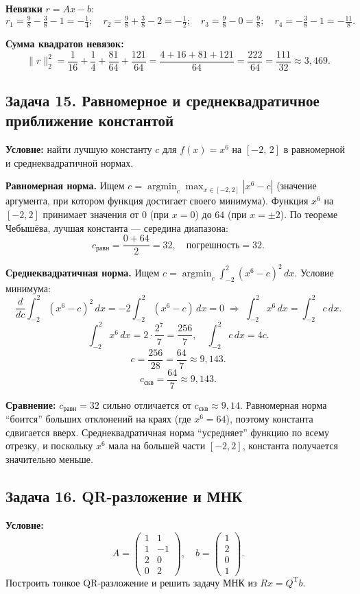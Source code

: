\documentclass{article}
\begin{document}
\textbf{Невязки} $r = Ax - b$:
$$r_1 = \tfrac{9}{8} - \tfrac{3}{8} - 1 = -\tfrac{1}{4}; \quad r_2 = \tfrac{9}{8} + \tfrac{3}{8} - 2 = -\tfrac{1}{2}; \quad r_3 = \tfrac{9}{8} - 0 = \tfrac{9}{8}; \quad r_4 = -\tfrac{3}{8} - 1 = -\tfrac{11}{8}.$$

\textbf{Сумма квадратов невязок:}
$$\|r\|_2^2 = \frac{1}{16} + \frac{1}{4} + \frac{81}{64} + \frac{121}{64} = \frac{4 + 16 + 81 + 121}{64} = \frac{222}{64} = \frac{111}{32} \approx 3,469.$$


\subsection*{Задача 15. Равномерное и среднеквадратичное приближение константой}
\textbf{Условие:} найти лучшую константу $c$ для $f(x) = x^6$ на $[-2,\,2]$ в равномерной и среднеквадратичной нормах.

\textbf{Равномерная норма.} Ищем $c = \operatorname{argmin}_c \max_{x\in[-2,2]} |x^6 - c|$ (значение аргумента, при котором функция достигает своего минимума).
Функция $x^6$ на $[-2,2]$ принимает значения от $0$ (при $x=0$) до $64$ (при $x=\pm 2$). По теореме Чебышёва, лучшая константа --- середина диапазона:
$$\boxed{c_{\text{равн}} = \frac{0 + 64}{2} = 32, \quad \text{погрешность} = 32.}$$

\textbf{Среднеквадратичная норма.} Ищем $c = \operatorname{argmin}_c \int_{-2}^{2}(x^6 - c)^2\,dx$.
Условие минимума:
$$\frac{d}{dc}\int_{-2}^{2}(x^6 - c)^2\,dx = -2\int_{-2}^{2}(x^6 - c)\,dx = 0 \;\Rightarrow\; \int_{-2}^{2}x^6\,dx = \int_{-2}^{2}c\,dx.$$
$$\int_{-2}^{2}x^6\,dx = 2\cdot\frac{2^7}{7} = \frac{256}{7}, \quad \int_{-2}^{2}c\,dx = 4c.$$
$$c = \frac{256}{28} = \frac{64}{7} \approx 9,143.$$
$$\boxed{c_{\text{скв}} = \frac{64}{7} \approx 9,143.}$$

\textbf{Сравнение:} $c_{\text{равн}} = 32$ сильно отличается от $c_{\text{скв}} \approx 9,14$. Равномерная норма ``боится'' больших отклонений на краях (где $x^6 = 64$), поэтому константа сдвигается вверх. Среднеквадратичная норма ``усредняет'' функцию по всему отрезку, и поскольку $x^6$ мала на большей части $[-2,2]$, константа получается значительно меньше.


\subsection*{Задача 16. QR-разложение и МНК}
\textbf{Условие:}
$$A = \begin{pmatrix} 1 & 1 \\ 1 & -1 \\ 2 & 0 \\ 0 & 2 \end{pmatrix}, \quad b = \begin{pmatrix} 1 \\ 2 \\ 0 \\ 1 \end{pmatrix}.$$
Построить тонкое QR-разложение и решить задачу МНК из $Rx = Q^\text{T}b$.
\end{document}
